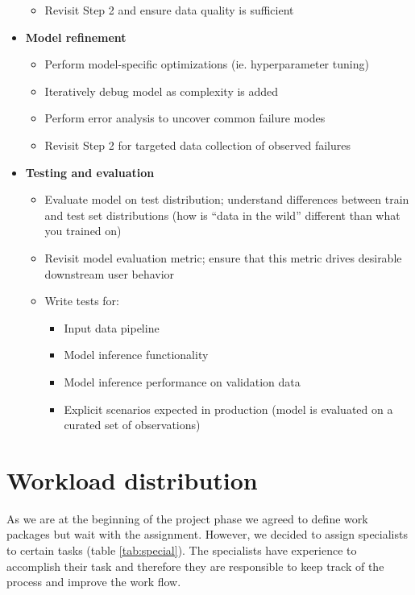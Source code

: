 \documentclass[lang=english,inputenc=utf8,fontsize=10pt]{ldvarticle}
\begin{document}
\begin{itemize}
\begin{itemize}
        \item Revisit Step 2 and ensure data quality is sufficient
    \end{itemize}
    \item \textbf{Model refinement}
    \begin{itemize}
        \item Perform model-specific optimizations (ie. hyperparameter tuning)
        \item Iteratively debug model as complexity is added
        \item Perform error analysis to uncover common failure modes
        \item Revisit Step 2 for targeted data collection of observed failures
    \end{itemize}
    \item \textbf{Testing and evaluation}
    \begin{itemize}
        \item Evaluate model on test distribution; understand differences between train and test set distributions (how is “data in the wild” different than what you trained on)
        \item Revisit model evaluation metric; ensure that this metric drives desirable downstream user behavior
        \item Write tests for:
        \begin{itemize}
            \item Input data pipeline
            \item Model inference functionality
            \item Model inference performance on validation data
            \item Explicit scenarios expected in production (model is evaluated on a curated set of observations)
        \end{itemize}
    \end{itemize}
\end{itemize}

\section{Workload distribution}
As we are at the beginning of the project phase we agreed to define work packages but wait with the assignment. However, we decided to assign specialists to certain tasks (table \ref{tab:special}). The specialists have experience to accomplish their task and therefore they are responsible to keep track of the process and improve the work flow.\\
\end{document}

